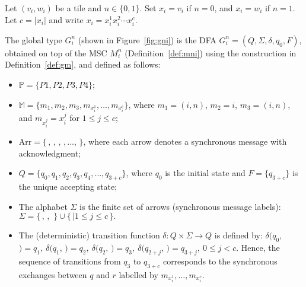 \bigskip

\begin{definition}[$G_i^n$]\label{def:gni}
Let $(v_i, w_i)$ be a tile and $n \in \{0,1\}$.  
Set $x_i = v_i$ if $n = 0$, and $x_i = w_i$ if $n = 1$.  
Let $c = |x_i|$ and write $x_i = x_i^1 x_i^2 \cdots x_i^c$.

The global type $G_i^n$ (shown in Figure~\ref{fig:gni}) is the DFA
$G_i^n = (Q, \Sigma, \delta, q_0, F)$, obtained
on top of the MSC $M_i^n$ (Definition~\ref{def:mni}) using the 
construction in Definition~\ref{def:gm}, and defined as follows:
\begin{itemize}
	\item $\mathbb{P} = \{P1, P2, P3, P4\}$;
	\item $\mathbb{M} = \{m_1, m_2, m_3, m_{x_i^1}, \ldots, m_{x_i^c}\}$,
	      where $m_1 = (i, n)$, $m_2 = i$, $m_3 = (i, n)$, and
	      $m_{x_i^j} = x_i^j$ for $1 \le j \le c$;
	\item $\text{Arr} = \{\,$$,\, $$,\,
	      $$,\, $$, \ldots,
	      $$\,\}$, where each arrow denotes
	      a synchronous message with acknowledgment;
	\item $Q = \{q_0, q_1, q_2, q_3, q_4, \ldots, q_{3+c}\}$,  
	      where $q_0$ is the initial state and  
	      $F = \{q_{3+c}\}$ is the unique accepting state;
	\item The alphabet $\Sigma$ is the finite set of arrows (synchronous message labels):  
	      $
	      \Sigma = 
	      \{\,$$,\,
	           $$,\,
	           $$\,\}
	      \cup
	      \{\,$$ \mid 1 \le j \le c\,\}.
	      $
	\item The (deterministic) transition function
	      $\delta : Q \times \Sigma \to Q$ is defined by:
	        $  \delta(q_0,\, $$) = q_1,\ 
	          \delta(q_1,\, $$) = q_2, \ 
	          \delta(q_2,\, $$) = q_3, \ 
	          \delta(q_{2+j},\, $$) = q_{3+j}, 
	          \  0 \le j < c.$
	      Hence, the sequence of transitions from $q_3$ to $q_{3+c}$ 
	      corresponds to the synchronous exchanges between $q$ and $r$
	      labelled by $m_{x_i^1}, \ldots, m_{x_i^c}$.
\end{itemize}

	\begin{figure}[!ht]
		\centering
\end{figure}
\end{definition}
